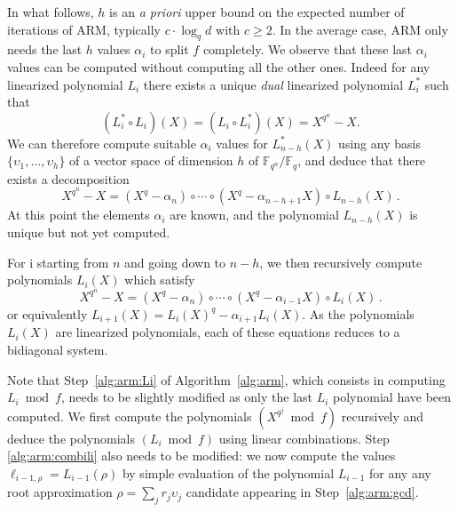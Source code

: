 \documentclass{article}
\newcommand{\ff}[1]{\mathbb{F}_{#1}}
\newcommand{\dd}{d}
\newcommand{\qq}{q}
\newcommand{\nn}{n}
\newcommand{\qn}{{\qq^\nn}}
\newcommand{\basef}{\ff{\qq}}
\newcommand{\extf}{\ff{\qn}}
\newcommand{\bigO}{O}
\newcommand{\Mul}{\mathsf{M}}
\begin{document}
In what follows, $h$ is an \emph{a priori} upper bound on the expected number of iterations of ARM, typically $c \cdot \log_\qq d$ with $c \ge 2$. 
%
In the average case, ARM only needs the last $h$ values $\alpha_i$ to split $f$ completely.
%
We observe that these last $\alpha_i$ values can be computed without computing all the other ones. Indeed 
for any linearized polynomial $L_i$ there exists a unique \emph{dual} linearized polynomial $L_i^\ast$ such that $$(L_i^\ast\circ L_i)(X)=(L_i\circ L_i^\ast)(X)=X^{\qq^\nn}-X.$$
%
We can therefore compute suitable $\alpha_i$ values for $L_{n-h}^\ast(X)$ using any basis $\{\upsilon_{1},\ldots,\upsilon_h\}$ of a vector space of dimension $h$ of $\extf/\basef$, and deduce that there exists a decomposition
$$X^{\qq^\nn}-X=(X^{\qq}-\alpha_n) \circ \cdots \circ (X^{\qq}-\alpha_{n-h+1} X) \circ L_{n-h}(X)\,.$$
At this point the elements $\alpha_i$ are known, and the polynomial $L_{n-h}(X)$ is unique but not yet computed. %

For i starting from $\nn$ and going down to $n-h$, we then recursively compute polynomials $L_i(X)$ which satisfy
$$X^{\qq^\nn}-X= (X^{\qq}-\alpha_n) \circ \cdots \circ (X^{\qq}-\alpha_{i-1} X) \circ L_{i}(X)\,.  $$
or equivalently $L_{i+1}(X)=L_i(X)^q-\alpha_{i+1}L_i(X)$. 
%
As the polynomials $L_i(X)$ are linearized polynomials, each of these equations reduces to
a bidiagonal system. %

Note that Step~\ref{alg:arm:Li} of Algorithm~\ref{alg:arm}, which consists in computing $L_i \bmod f$, needs to be slightly modified as only the last $L_i$ polynomial have been computed. %
We first compute the polynomials $(X^{q^j}\bmod f)$ recursively and deduce the polynomials $(L_i\bmod f)$ using linear combinations.
%
Step \ref{alg:arm:combili}  also needs to be modified: we now compute the values $\ell_{i-1, \rho}= L_{i-1}(\rho)$ by simple evaluation of the polynomial $L_{i-1}$ for any any root approximation $\rho=\sum_j r_j \upsilon_j$ candidate appearing in Step~\ref{alg:arm:gcd}. %
 
\end{document}
